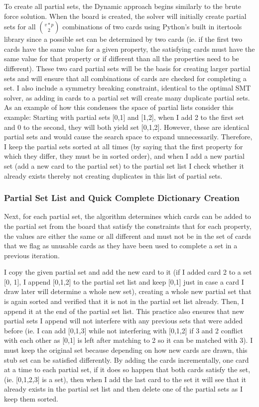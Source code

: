 \documentclass[pageno]{jpaper}
\begin{document}
To create all partial sets, the Dynamic approach begins similarly to the brute force solution. When the board is created, the solver will initially create partial sets for all ${v*p}\choose{2}$ combinations of two cards using Python's built in itertools library since a possible set can be determined by two cards (ie. if the first two cards have the same value for a given property, the satisfying cards must have the same value for that property or if different than all the properties need to be different). These two card partial sets will be the basis for creating larger partial sets and will ensure that all combinations of cards are checked for completing a set. I also include a symmetry breaking constraint, identical to the optimal SMT solver, as adding in cards to a partial set will create many duplicate partial sets. As an example of how this condenses the space of partial lists consider this example: Starting with partial sets [0,1] and [1,2], when I add 2 to the first set and 0 to the second, they will both yield set [0,1,2]. However, these are identical partial sets and would cause the search space to expand unnecessarily.  Therefore, I keep the partial sets sorted at all times (by saying that the first property for which they differ, they must be in sorted order), and when I add a new partial set (add a new card to the partial set) to the partial set list I check whether it already exists thereby not creating duplicates in this list of partial sets.

\subsubsection{Partial Set List and Quick Complete Dictionary Creation}

Next, for each partial set, the algorithm determines which cards can be added to the partial set from the board that satisfy the constraints that for each property, the values are either the same or all different and must not be in the set of cards that we flag as unusable cards as they have been used to complete a set in a previous iteration. 

I copy the given partial set and add the new card to it (if I added card 2 to a set [0, 1], I append [0,1,2] to the partial set list and keep [0,1] just in case a card I draw later will determine a whole new set), creating a whole new partial set that is again sorted and verified that it is not in the partial set list already. Then, I append it at the end of the partial set list. This practice also ensures that new partial sets I append will not interfere with any previous sets that were added before (ie. I can add [0,1,3] while not interfering with [0,1,2] if 3 and 2 conflict with each other as [0,1] is left after matching to 2 so it can be matched with 3). I must keep the original set because depending on how new cards are drawn, this stub set can be satisfied differently. By adding the cards incrementally, one card at a time to each partial set, if it does so happen that both cards satisfy the set, (ie. [0,1,2,3] is a set), then when I add the last card to the set it will see that it already exists in the partial set list and then delete one of the partial sets as I keep them sorted.
\end{document}
